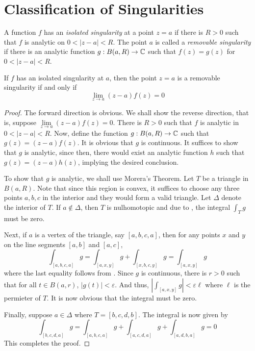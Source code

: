 \section{Classification of Singularities}

\begin{definition}
    A function $f$ has an \textit{isolated singularity} at a point $z = a$ if there is $R > 0$ such that $f$ is analytic on $0 < |z - a| < R$. The point $a$ is called a \textit{removable singularity} if there is an analytic function $g: B(a,R)\to\mathbb{C}$ such that $f(z) = g(z)$ for $0 < |z - a| < R$.
\end{definition}

\begin{theorem}
    If $f$ has an isolated singularity at $a$, then the point $z = a$ is a removable singularity if and only if 
    \begin{equation*}
        \lim_{z\to a}(z - a)f(z) = 0
    \end{equation*}
\end{theorem}
\begin{proof}
    The forward direction is obvious. We shall show the reverse direction, that is, suppose $\lim\limits_{z\to a}(z - a)f(z) = 0$. There is $R > 0$ such that $f$ is analytic in $0 < |z - a| < R$. Now, define the function $g: B(a,R)\to\mathbb{C}$ such that $g(z) = (z - a)f(z)$. It is obvious that $g$ is continuous. It suffices to show that $g$ is analytic, since then, there would exist an analytic function $h$ such that $g(z) = (z - a)h(z)$, implying the desired conclusion.

    To show that $g$ is analytic, we shall use Morera's Theorem. Let $T$ be a triangle in $B(a,R)$. Note that since this region is convex, it suffices to choose any three points $a,b,c$ in the interior and they would form a valid triangle. Let $\Delta$ denote the interior of $T$. If $a\notin\Delta$, then $T$ is nulhomotopic and due to , the integral $\int_T g$ must be zero. 

    Next, if $a$ is a vertex of the triangle, say $[a,b,c,a]$, then for any points $x$ and $y$ on the line segments $[a,b]$ and $[a,c]$, 
    \begin{equation*}
        \int_{[a,b,c,a]} g = \int_{[a,x,y]} g + \int_{[x,b,c,y]} g = \int_{[a,x,y]} g
    \end{equation*}
    where the last equality follows from . Since $g$ is continuous, there is $r > 0$ such that for all $t\in B(a,r)$, $|g(t)| < \varepsilon$. And thus, $|\int_{[a,x,y]} g| < \varepsilon\ell$ where $\ell$ is the permieter of $T$. It is now obvious that the integral must be zero. 

    Finally, suppose $a\in\Delta$ where $T = [b,c,d,b]$. The integral is now given by 
    \begin{equation*}
        \int_{[b,c,d,a]}g = \int_{[a,b,c,a]}g + \int_{[a,c,d,a]}g + \int_{[a,d,b,a]} g = 0
    \end{equation*}
    This completes the proof.
\end{proof}

